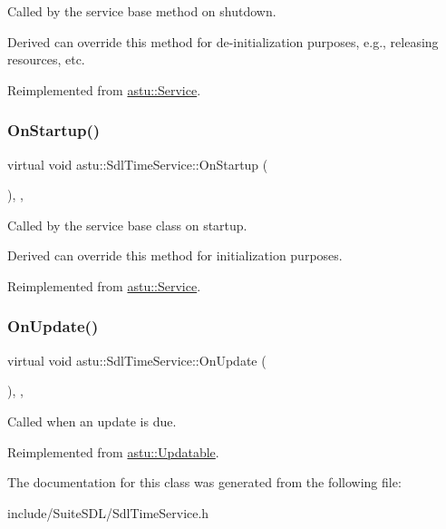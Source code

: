 Called by the service base method on shutdown.

Derived can override this method for de-\/initialization purposes, e.\+g., releasing resources, etc. 

Reimplemented from \hyperlink{classastu_1_1Service_a1e1dff727df791c57fae782d8a613c5f}{astu\+::\+Service}.

\mbox{\label{classastu_1_1SdlTimeService_ac11551691bb14289020028a2a162c7d6}} 
\subsubsection{\texorpdfstring{On\+Startup()}{OnStartup()}}
{\footnotesize\ttfamily virtual void astu\+::\+Sdl\+Time\+Service\+::\+On\+Startup (\begin{DoxyParamCaption}{ }\end{DoxyParamCaption})\hspace{0.3cm}{\ttfamily [override]}, {\ttfamily [protected]}, {\ttfamily [virtual]}}

Called by the service base class on startup.

Derived can override this method for initialization purposes. 

Reimplemented from \hyperlink{classastu_1_1Service_a357dc663e000b1f086f681ec3c459bfe}{astu\+::\+Service}.

\mbox{\label{classastu_1_1SdlTimeService_ada8347f0f665616a2202919e71b76302}} 
\subsubsection{\texorpdfstring{On\+Update()}{OnUpdate()}}
{\footnotesize\ttfamily virtual void astu\+::\+Sdl\+Time\+Service\+::\+On\+Update (\begin{DoxyParamCaption}{ }\end{DoxyParamCaption})\hspace{0.3cm}{\ttfamily [override]}, {\ttfamily [protected]}, {\ttfamily [virtual]}}

Called when an update is due. 

Reimplemented from \hyperlink{classastu_1_1Updatable_a925566c9770b95895c6c7294f9d51528}{astu\+::\+Updatable}.



The documentation for this class was generated from the following file\+:\begin{DoxyCompactItemize}
\item 
include/\+Suite\+S\+D\+L/Sdl\+Time\+Service.\+h\end{DoxyCompactItemize}

